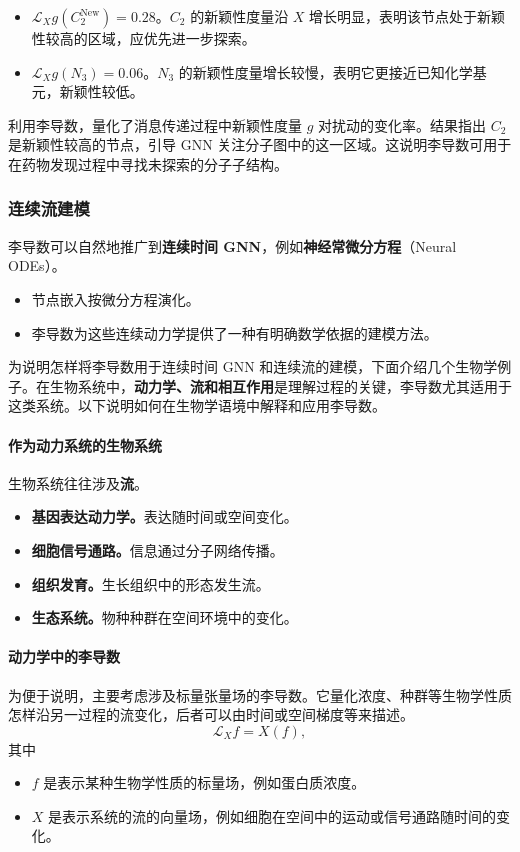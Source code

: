 \begin{itemize}
  \item $\mathcal L_Xg(C_2^{\mathrm{New}})=0.28$。$C_2$ 的新颖性度量沿 $X$ 增长明显，表明该节点处于新颖性较高的区域，应优先进一步探索。
  \item $\mathcal L_Xg(N_3)=0.06$。$N_3$ 的新颖性度量增长较慢，表明它更接近已知化学基元，新颖性较低。
\end{itemize}
利用李导数，量化了消息传递过程中新颖性度量 $g$ 对扰动的变化率。结果指出 $C_2$ 是新颖性较高的节点，引导 GNN 关注分子图中的这一区域。这说明李导数可用于在药物发现过程中寻找未探索的分子子结构。

\subsubsection{连续流建模}
李导数可以自然地推广到\textbf{连续时间 GNN}，例如\textbf{神经常微分方程}（Neural ODEs）。
\begin{itemize}
  \item 节点嵌入按微分方程演化。
  \item 李导数为这些连续动力学提供了一种有明确数学依据的建模方法。
\end{itemize}

为说明怎样将李导数用于连续时间 GNN 和连续流的建模，下面介绍几个生物学例子。在生物系统中，\textbf{动力学、流和相互作用}是理解过程的关键，李导数尤其适用于这类系统。以下说明如何在生物学语境中解释和应用李导数。

\paragraph{作为动力系统的生物系统}
生物系统往往涉及\textbf{流}。
\begin{itemize}
  \item \textbf{基因表达动力学。}表达随时间或空间变化。
  \item \textbf{细胞信号通路。}信息通过分子网络传播。
  \item \textbf{组织发育。}生长组织中的形态发生流。
  \item \textbf{生态系统。}物种种群在空间环境中的变化。
\end{itemize}

\paragraph{动力学中的李导数}
为便于说明，主要考虑涉及标量张量场的李导数。它量化浓度、种群等生物学性质怎样沿另一过程的流变化，后者可以由时间或空间梯度等来描述。
\[
  \mathcal L_Xf=X(f),
\]
其中
\begin{itemize}
  \item $f$ 是表示某种生物学性质的标量场，例如蛋白质浓度。
  \item $X$ 是表示系统的流的向量场，例如细胞在空间中的运动或信号通路随时间的变化。
\end{itemize}


